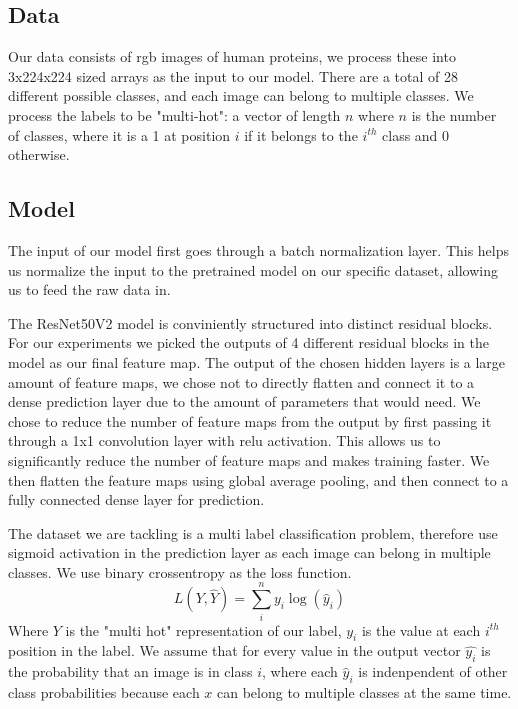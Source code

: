 \documentclass{article}
\begin{document}
\subsection{Data}
Our data consists of rgb images of human proteins, we process these into 3x224x224 sized
arrays as the input to our model. There are a total of 28 different possible classes,
and each image can belong to multiple classes. We process the labels to be "multi-hot":
a vector of length $n$ where $n$ is the number of classes, where it is a 1 at position $i$ if 
it belongs to the $i^{th}$ class and 0 otherwise.
\subsection{Model}

The input of our model first goes through a batch normalization layer. This helps
us normalize the input to the pretrained model on our specific dataset, allowing us 
to feed the raw data in.

The ResNet50V2 model is conviniently structured into distinct residual blocks.
For our experiments we picked the outputs of 4 different residual blocks in the model
as our final feature map. The output of the chosen hidden layers is a large amount of 
feature maps, we chose not to directly flatten and connect it to a dense prediction
layer due to the amount of parameters that would need. We chose to reduce the number of 
feature maps from the output by first passing it through a 1x1 convolution layer with 
relu activation. This allows us to significantly reduce the number of feature maps and makes training faster. 
We then flatten the feature maps using global average pooling, and then connect to a 
fully connected dense layer for prediction. 

The dataset we are tackling is a multi label classification problem, therefore use sigmoid activation
in the prediction layer as each image can belong in multiple classes. We  use binary crossentropy as the loss function. 
\begin{equation}
    L(Y, \hat{Y}) = \sum_i^n y_i\log{(\hat{y}_i)}
\end{equation}
Where $Y$ is the "multi hot" representation of our label, $y_i$
is the value at each $i^{th}$ position in the label.  We assume that for every value in the output vector $\hat{y_i}$ is the probability
that an image is in class $i$, where each $\hat{y}_i$ is indenpendent of other class probabilities because 
each $x$ can belong to multiple classes at the same time. 
\end{document}
